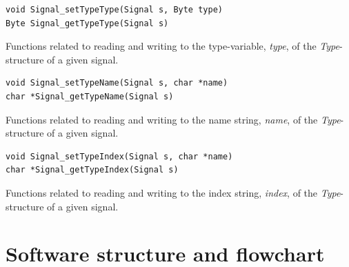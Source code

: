 \documentclass[main.tex]{subfiles}
\begin{document}
\begin{lstlisting}[frame=single] 
void Signal_setTypeType(Signal s, Byte type)
Byte Signal_getTypeType(Signal s)
\end{lstlisting}

Functions related to reading and writing to the type-variable, \textit{type}, of the \textit{Type}-structure of a given signal.\\

\begin{lstlisting}[frame=single] 
void Signal_setTypeName(Signal s, char *name)
char *Signal_getTypeName(Signal s)
\end{lstlisting}

Functions related to reading and writing to the name string, \textit{name}, of the \textit{Type}-structure of a given signal.\\

\begin{lstlisting}[frame=single] 
void Signal_setTypeIndex(Signal s, char *name)
char *Signal_getTypeIndex(Signal s)
\end{lstlisting}

Functions related to reading and writing to the index string, \textit{index}, of the \textit{Type}-structure of a given signal.\\

\section{Software structure and flowchart}
\end{document}
